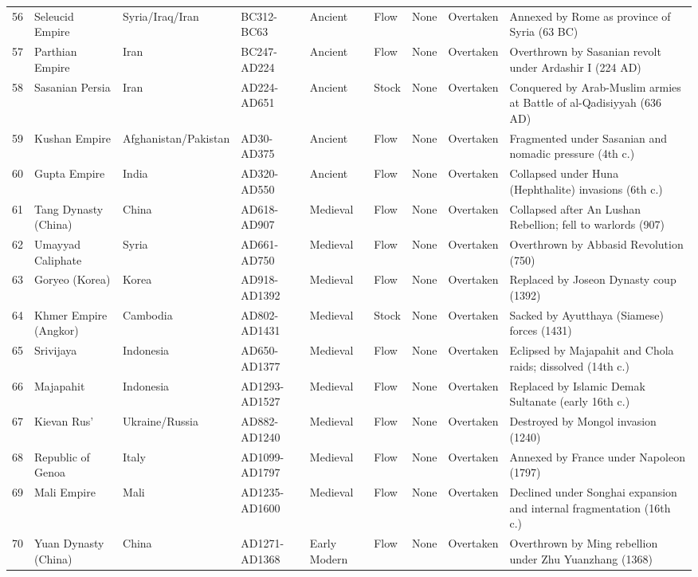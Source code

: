 \documentclass[11pt]{article}
\begin{document}
\begin{longtable}{@{}r l l l l l l l p{5.5cm}@{}}
56 & Seleucid Empire & Syria/Iraq/Iran & BC312-BC63 & Ancient & Flow & None & Overtaken & Annexed by Rome as province of Syria (63 BC) \\
57 & Parthian Empire & Iran & BC247-AD224 & Ancient & Flow & None & Overtaken & Overthrown by Sasanian revolt under Ardashir I (224 AD) \\
58 & Sasanian Persia & Iran & AD224-AD651 & Ancient & Stock & None & Overtaken & Conquered by Arab-Muslim armies at Battle of al-Qadisiyyah (636 AD) \\
59 & Kushan Empire & Afghanistan/Pakistan & AD30-AD375 & Ancient & Flow & None & Overtaken & Fragmented under Sasanian and nomadic pressure (4th c.) \\
60 & Gupta Empire & India & AD320-AD550 & Ancient & Flow & None & Overtaken & Collapsed under Huna (Hephthalite) invasions (6th c.) \\
61 & Tang Dynasty (China) & China & AD618-AD907 & Medieval & Flow & None & Overtaken & Collapsed after An Lushan Rebellion; fell to warlords (907) \\
62 & Umayyad Caliphate & Syria & AD661-AD750 & Medieval & Flow & None & Overtaken & Overthrown by Abbasid Revolution (750) \\
63 & Goryeo (Korea) & Korea & AD918-AD1392 & Medieval & Flow & None & Overtaken & Replaced by Joseon Dynasty coup (1392) \\
64 & Khmer Empire (Angkor) & Cambodia & AD802-AD1431 & Medieval & Stock & None & Overtaken & Sacked by Ayutthaya (Siamese) forces (1431) \\
65 & Srivijaya & Indonesia & AD650-AD1377 & Medieval & Flow & None & Overtaken & Eclipsed by Majapahit and Chola raids; dissolved (14th c.) \\
66 & Majapahit & Indonesia & AD1293-AD1527 & Medieval & Flow & None & Overtaken & Replaced by Islamic Demak Sultanate (early 16th c.) \\
67 & Kievan Rus' & Ukraine/Russia & AD882-AD1240 & Medieval & Flow & None & Overtaken & Destroyed by Mongol invasion (1240) \\
68 & Republic of Genoa & Italy & AD1099-AD1797 & Medieval & Flow & None & Overtaken & Annexed by France under Napoleon (1797) \\
69 & Mali Empire & Mali & AD1235-AD1600 & Medieval & Flow & None & Overtaken & Declined under Songhai expansion and internal fragmentation (16th c.) \\
70 & Yuan Dynasty (China) & China & AD1271-AD1368 & Early Modern & Flow & None & Overtaken & Overthrown by Ming rebellion under Zhu Yuanzhang (1368) \\

\end{longtable}
\end{document}
